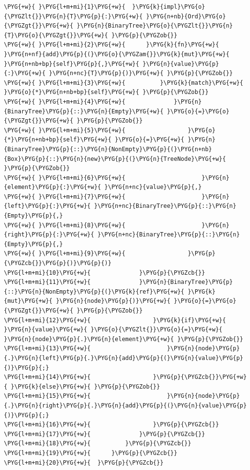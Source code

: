 \begin{Verbatim}[commandchars=\\\{\},breaklines=true,breakanywhere=true,fontsize=\codefont,xleftmargin=17bp]
\PYG{+w}{ }\PYG{l+m+mi}{1}\PYG{+w}{  }\PYG{k}{impl}\PYG{o}{\PYGZlt{}}\PYG{n}{T}\PYG{p}{:}\PYG{+w}{ }\PYG{n+nb}{Ord}\PYG{o}{\PYGZgt{}}\PYG{+w}{ }\PYG{n}{BinaryTree}\PYG{o}{\PYGZlt{}}\PYG{n}{T}\PYG{o}{\PYGZgt{}}\PYG{+w}{ }\PYG{p}{\PYGZob{}}
\PYG{+w}{ }\PYG{l+m+mi}{2}\PYG{+w}{      }\PYG{k}{fn}\PYG{+w}{ }\PYG{n+nf}{add}\PYG{p}{(}\PYG{o}{\PYGZam{}}\PYG{k}{mut}\PYG{+w}{ }\PYG{n+nb+bp}{self}\PYG{p}{,}\PYG{+w}{ }\PYG{n}{value}\PYG{p}{:}\PYG{+w}{ }\PYG{n+nc}{T}\PYG{p}{)}\PYG{+w}{ }\PYG{p}{\PYGZob{}}
\PYG{+w}{ }\PYG{l+m+mi}{3}\PYG{+w}{          }\PYG{k}{match}\PYG{+w}{ }\PYG{o}{*}\PYG{n+nb+bp}{self}\PYG{+w}{ }\PYG{p}{\PYGZob{}}
\PYG{+w}{ }\PYG{l+m+mi}{4}\PYG{+w}{              }\PYG{n}{BinaryTree}\PYG{p}{::}\PYG{n}{Empty}\PYG{+w}{ }\PYG{o}{=}\PYG{o}{\PYGZgt{}}\PYG{+w}{ }\PYG{p}{\PYGZob{}}
\PYG{+w}{ }\PYG{l+m+mi}{5}\PYG{+w}{                  }\PYG{o}{*}\PYG{n+nb+bp}{self}\PYG{+w}{ }\PYG{o}{=}\PYG{+w}{ }\PYG{n}{BinaryTree}\PYG{p}{::}\PYG{n}{NonEmpty}\PYG{p}{(}\PYG{n+nb}{Box}\PYG{p}{::}\PYG{n}{new}\PYG{p}{(}\PYG{n}{TreeNode}\PYG{+w}{ }\PYG{p}{\PYGZob{}}
\PYG{+w}{ }\PYG{l+m+mi}{6}\PYG{+w}{                      }\PYG{n}{element}\PYG{p}{:}\PYG{+w}{ }\PYG{n+nc}{value}\PYG{p}{,}
\PYG{+w}{ }\PYG{l+m+mi}{7}\PYG{+w}{                      }\PYG{n}{left}\PYG{p}{:}\PYG{+w}{ }\PYG{n+nc}{BinaryTree}\PYG{p}{::}\PYG{n}{Empty}\PYG{p}{,}
\PYG{+w}{ }\PYG{l+m+mi}{8}\PYG{+w}{                      }\PYG{n}{right}\PYG{p}{:}\PYG{+w}{ }\PYG{n+nc}{BinaryTree}\PYG{p}{::}\PYG{n}{Empty}\PYG{p}{,}
\PYG{+w}{ }\PYG{l+m+mi}{9}\PYG{+w}{                  }\PYG{p}{\PYGZcb{}}\PYG{p}{)}\PYG{p}{)}
\PYG{l+m+mi}{10}\PYG{+w}{              }\PYG{p}{\PYGZcb{}}
\PYG{l+m+mi}{11}\PYG{+w}{              }\PYG{n}{BinaryTree}\PYG{p}{::}\PYG{n}{NonEmpty}\PYG{p}{(}\PYG{k}{ref}\PYG{+w}{ }\PYG{k}{mut}\PYG{+w}{ }\PYG{n}{node}\PYG{p}{)}\PYG{+w}{ }\PYG{o}{=}\PYG{o}{\PYGZgt{}}\PYG{+w}{ }\PYG{p}{\PYGZob{}}
\PYG{l+m+mi}{12}\PYG{+w}{                  }\PYG{k}{if}\PYG{+w}{ }\PYG{n}{value}\PYG{+w}{ }\PYG{o}{\PYGZlt{}}\PYG{o}{=}\PYG{+w}{ }\PYG{n}{node}\PYG{p}{.}\PYG{n}{element}\PYG{+w}{ }\PYG{p}{\PYGZob{}}
\PYG{l+m+mi}{13}\PYG{+w}{                      }\PYG{n}{node}\PYG{p}{.}\PYG{n}{left}\PYG{p}{.}\PYG{n}{add}\PYG{p}{(}\PYG{n}{value}\PYG{p}{)}\PYG{p}{;}
\PYG{l+m+mi}{14}\PYG{+w}{                  }\PYG{p}{\PYGZcb{}}\PYG{+w}{ }\PYG{k}{else}\PYG{+w}{ }\PYG{p}{\PYGZob{}}
\PYG{l+m+mi}{15}\PYG{+w}{                      }\PYG{n}{node}\PYG{p}{.}\PYG{n}{right}\PYG{p}{.}\PYG{n}{add}\PYG{p}{(}\PYG{n}{value}\PYG{p}{)}\PYG{p}{;}
\PYG{l+m+mi}{16}\PYG{+w}{                  }\PYG{p}{\PYGZcb{}}
\PYG{l+m+mi}{17}\PYG{+w}{              }\PYG{p}{\PYGZcb{}}
\PYG{l+m+mi}{18}\PYG{+w}{          }\PYG{p}{\PYGZcb{}}
\PYG{l+m+mi}{19}\PYG{+w}{      }\PYG{p}{\PYGZcb{}}
\PYG{l+m+mi}{20}\PYG{+w}{  }\PYG{p}{\PYGZcb{}}
\end{Verbatim}

